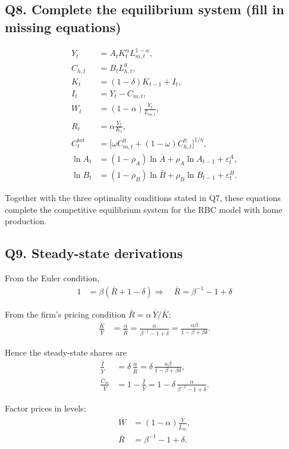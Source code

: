 \documentclass[a4paper,12pt]{article} %
\theoremstyle{nonitalic}
\begin{document}
\subsection*{Q8. Complete the equilibrium system (fill in missing equations)}
\begin{align*}
Y_t &= A_t K_t^{\alpha} L_{m,t}^{1-\alpha},\\
C_{h,t} &= B_t L_{h,t}^{\theta},\\
K_t &= (1-\delta)K_{t-1}+I_t,\\
I_t &= Y_t - C_{m,t},\\
W_t &= (1-\alpha)\frac{Y_t}{L_{m,t}},\\
R_t &= \alpha\frac{Y_t}{K_t},\\
C^{\mathrm{tot}}_t &= \big[\omega C_{m,t}^{\eta}+(1-\omega)C_{h,t}^{\eta}\big]^{1/\eta},\\
\ln A_t &= (1-\rho_A)\ln\bar A+\rho_A\ln A_{t-1}+\varepsilon^A_t, \\
\ln B_t &= (1-\rho_B)\ln\bar B+\rho_B\ln B_{t-1}+\varepsilon^B_t.
\end{align*}

Together with the three optimality conditions stated in Q7,
these equations complete the competitive equilibrium system for the RBC model with home production.

\subsection*{Q9. Steady-state derivations}
From the Euler condition,
\begin{align}
1 &= \beta(\bar R+1-\delta)
\Rightarrow\quad \bar R = \beta^{-1}-1+\delta
\end{align}

From the firm's pricing condition $\bar R=\alpha\,\bar Y/\bar K$:
\begin{align}
\frac{\bar K}{\bar Y} &= \frac{\alpha}{\bar R}
= \frac{\alpha}{\beta^{-1}-1+\delta} = \frac{\alpha \beta}{1 - \beta + \beta \delta}.
\end{align}

Hence the steady-state shares are
\begin{align}
\frac{\bar I}{\bar Y} &= \delta\,\frac{\alpha}{\bar R}
= \delta\,\frac{\alpha \beta}{1 - \beta + \beta \delta}, \\
\frac{\bar C_m}{\bar Y} &= 1-\frac{\bar I}{\bar Y}
= 1-\delta\,\frac{\alpha}{\beta^{-1}-1+\delta}.
\end{align}

Factor prices in levels:
\begin{align}
\bar W &= (1-\alpha)\frac{\bar Y}{\bar L_m}, \\
\bar R &= \beta^{-1}-1+\delta.
\end{align}
\end{document}
